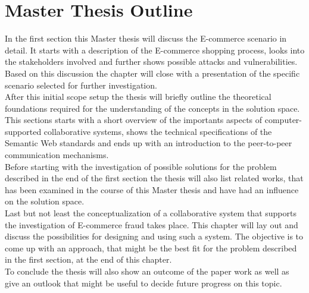 
\section{Master Thesis Outline}
\label{sec:thesis_outline}

In the first section this Master thesis will discuss the E-commerce scenario in detail. It starts with a description of the E-commerce shopping process, looks into the stakeholders involved and further shows possible attacks and vulnerabilities. Based on this discussion the chapter will close with a presentation of the specific scenario selected for further investigation. \\

After this initial scope setup the thesis will briefly outline the theoretical foundations required for the understanding of the concepts in the solution space. This sections starts with a short overview of the importants aspects of computer-supported collaborative systems, shows the technical specifications of the Semantic Web standards and ends up with an introduction to the peer-to-peer communication mechanisms. \\

Before starting with the investigation of possible solutions for the problem described in the end of the first section the thesis will also list related works, that has been examined in the course of this Master thesis and have had an influence on the solution space. \\

Last but not least the conceptualization of a collaborative system that supports the investigation of E-commerce fraud takes place. This chapter will lay out and discuss the possibilities for designing and using such a system. The objective is to come up with an approach, that might be the best fit for the problem described in the first section, at the end of this chapter. \\

To conclude the thesis will also show an outcome of the paper work as well as give an outlook that might be useful to decide future progress on this topic. 

